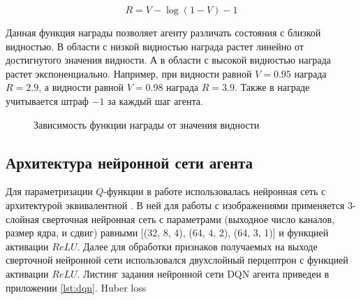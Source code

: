 \begin{equation}
    R = V - \log(1-V) - 1
\label{eq:dqn_reward}
\end{equation}

Данная функция награды позволяет агенту различать состояния с близкой видностью. В области с низкой видностью награда растет линейно от достигнутого значения видности. А в области с высокой видностью награда растет экспоненциально. Например, при видности равной $V = 0.95$ награда $R = 2.9$, а видности равной $V = 0.98$ награда $R = 3.9$. Также в награде учитывается штраф $-1$ за каждый шаг агента. 

\begin{figure}[ht]
\caption{Зависимость функции награды от значения видности}
\label{fig:reward_visib}
\end{figure}

\subsection{Архитектура нейронной сети агента}

Для параметризации $Q$-функции в работе использовалась нейронная сеть с архитектурой эквивалентной \cite{mnih2013atari}. В ней для работы с изображениями применяется 3-слойная сверточная нейронная сеть с параметрами (выходное число каналов, размер ядра, и сдвиг) равными [(32, 8, 4), (64, 4, 2), (64, 3, 1)] и функцией активации $ReLU$. Далее для обработки признаков получаемых на выходе сверточной нейронной сети использовался двухслойный перцептрон с функцией активации $ReLU$. Листинг задания нейронной сети DQN агента приведен в приложении \ref{lst:dqn}. 
Huber loss


